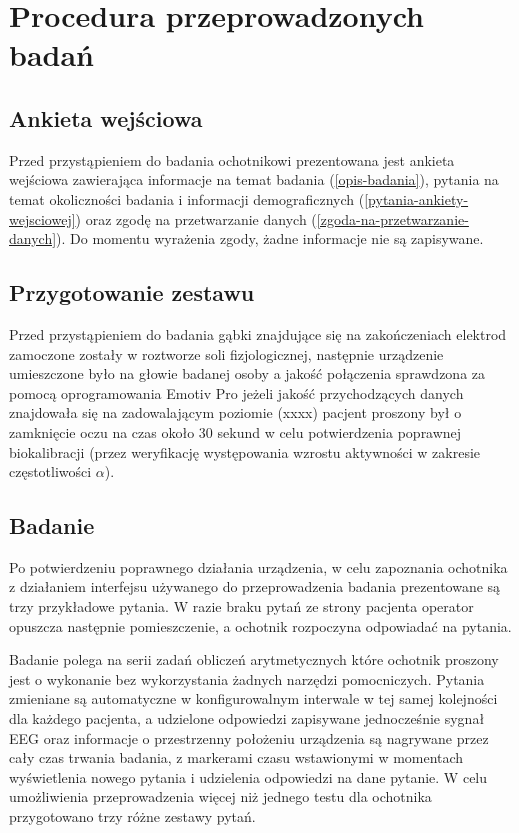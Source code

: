 \documentclass{./assets/wfis}
\begin{document}
\section{Procedura przeprowadzonych badań}\label{procedura-badan}
\subsection{Ankieta wejściowa}
Przed przystąpieniem do badania ochotnikowi prezentowana jest ankieta wejściowa zawierająca informacje na temat badania (\autoref{opis-badania}), pytania na temat okoliczności badania i informacji demograficznych (\autoref{pytania-ankiety-wejsciowej}) oraz zgodę na przetwarzanie danych (\autoref{zgoda-na-przetwarzanie-danych}). Do momentu wyrażenia zgody, żadne informacje nie są zapisywane.

\subsection{Przygotowanie zestawu}
Przed przystąpieniem do badania gąbki znajdujące się na zakończeniach elektrod zamoczone zostały w roztworze soli fizjologicznej, następnie urządzenie umieszczone było na głowie badanej osoby a jakość połączenia sprawdzona za pomocą oprogramowania Emotiv Pro \cite{} jeżeli jakość przychodzących danych znajdowała się na zadowalającym poziomie (xxxx) pacjent proszony był o zamknięcie oczu na czas około 30 sekund w celu potwierdzenia poprawnej biokalibracji (przez weryfikację występowania wzrostu aktywności w zakresie częstotliwości $\alpha$).

\subsection{Badanie}
Po potwierdzeniu poprawnego działania urządzenia, w celu zapoznania ochotnika z działaniem interfejsu używanego do przeprowadzenia badania prezentowane są trzy przykładowe pytania. W razie braku pytań ze strony pacjenta operator opuszcza następnie pomieszczenie, a ochotnik rozpoczyna odpowiadać na pytania.

Badanie polega na serii zadań obliczeń arytmetycznych które ochotnik proszony jest o wykonanie bez wykorzystania żadnych narzędzi pomocniczych. Pytania zmieniane są automatyczne w konfigurowalnym interwale w tej samej kolejności dla każdego pacjenta, a udzielone odpowiedzi zapisywane jednocześnie sygnał EEG oraz informacje o przestrzenny położeniu urządzenia są nagrywane przez cały czas trwania badania, z markerami czasu wstawionymi w momentach wyświetlenia nowego pytania i udzielenia odpowiedzi na dane pytanie. W celu umożliwienia przeprowadzenia więcej niż jednego testu dla ochotnika przygotowano trzy różne zestawy pytań.
\end{document}
